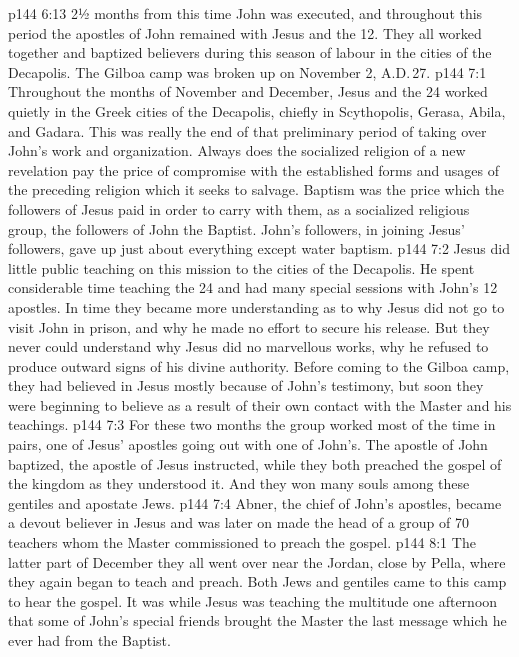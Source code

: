 \vs p144 6:13 \pc 2½ months from this time John was executed, and throughout this period the apostles of John remained with Jesus and the 12. They all worked together and baptized believers during this season of labour in the cities of the Decapolis. The Gilboa camp was broken up on November 2, A.D.\,27.
\vs p144 7:1 Throughout the months of November and December, Jesus and the 24 worked quietly in the Greek cities of the Decapolis, chiefly in Scythopolis, Gerasa, Abila, and Gadara. This was really the end of that preliminary period of taking over John’s work and organization. Always does the socialized religion of a new revelation pay the price of compromise with the established forms and usages of the preceding religion which it seeks to salvage. Baptism was the price which the followers of Jesus paid in order to carry with them, as a socialized religious group, the followers of John the Baptist. John’s followers, in joining Jesus’ followers, gave up just about everything except water baptism.
\vs p144 7:2 Jesus did little public teaching on this mission to the cities of the Decapolis. He spent considerable time teaching the 24 and had many special sessions with John’s 12 apostles. In time they became more understanding as to why Jesus did not go to visit John in prison, and why he made no effort to secure his release. But they never could understand why Jesus did no marvellous works, why he refused to produce outward signs of his divine authority. Before coming to the Gilboa camp, they had believed in Jesus mostly because of John’s testimony, but soon they were beginning to believe as a result of their own contact with the Master and his teachings.
\vs p144 7:3 For these two months the group worked most of the time in pairs, one of Jesus’ apostles going out with one of John’s. The apostle of John baptized, the apostle of Jesus instructed, while they both preached the gospel of the kingdom as they understood it. And they won many souls among these gentiles and apostate Jews.
\vs p144 7:4 Abner, the chief of John’s apostles, became a devout believer in Jesus and was later on made the head of a group of 70 teachers whom the Master commissioned to preach the gospel.
\vs p144 8:1 The latter part of December they all went over near the Jordan, close by Pella, where they again began to teach and preach. Both Jews and gentiles came to this camp to hear the gospel. It was while Jesus was teaching the multitude one afternoon that some of John’s special friends brought the Master the last message which he ever had from the Baptist.
